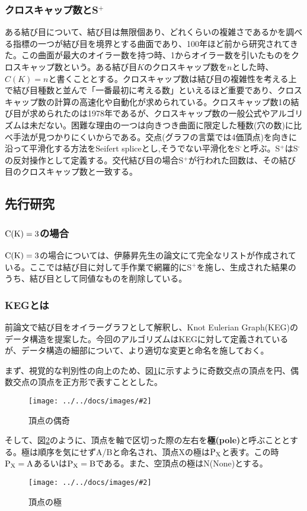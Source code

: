 \documentclass[11pt,a4j]{jarticle}
\newcommand{\splus}{S${}^\text{+}$}
\newcommand{\sminus}{S${}^\text{-}$}
\newcommand{\f}[1]{$\rm{#1}$} %
\newcommand{\image}[4][height=100pt]{%
\begin{figure}[htbp]
    \centering
    \texttt{[image: ../../docs/images/\#2]}
    \caption{#3}
    \label{fig:#4}
\end{figure}%
}
\newcommand{\tops}[2]{\texorpdfstring{#1}{#2}} %
\begin{document}
\subsubsection{クロスキャップ数と\tops{\splus}{splus}}
ある結び目について、結び目は無限個あり、どれくらいの複雑さであるかを調べる指標の一つが結び目を境界とする曲面であり、100年ほど前から研究されてきた。この曲面が最大のオイラー数を持つ時、1からオイラー数を引いたものをクロスキャップ数という。ある結び目$K$のクロスキャップ数を$n$とした時、$C(K)=n$と書くこととする。クロスキャップ数は結び目の複雑性を考える上で結び目種数と並んで「一番最初に考える数」といえるほど重要であり、クロスキャップ数の計算の高速化や自動化が求められている。クロスキャップ数1の結び目が求められたのは1978年\cite{MR478131}であるが、クロスキャップ数の一般公式やアルゴリズムは未だない。困難な理由の一つは向きつき曲面に限定した種数(穴の数)に比べ手法が見つかりにくいからである。交点(グラフの言葉では4価頂点)を向きに沿って平滑化する方法をSeifert spliceとし,そうでない平滑化を\sminus と呼ぶ。\splus は\sminus の反対操作として定義する。交代結び目の場合\splus が行われた回数は、その結び目のクロスキャップ数と一致する。


\subsection{先行研究}
\subsubsection{\tops{\f{C(K)=3}}{C(K)=3}の場合}
\f{C(K)=3}の場合については、伊藤昇先生の論文\cite{ck3}にて完全なリストが作成されている。ここでは結び目に対して手作業で網羅的に\splus を施し、生成された結果のうち、結び目として同値なものを削除している。

\subsubsection{KEGとは}
前論文\cite{keg}で結び目をオイラーグラフとして解釈し、Knot Eulerian Graph(KEG)のデータ構造を提案した。今回のアルゴリズムはKEGに対して定義されているが、データ構造の細部について、より適切な変更と命名を施しておく。

まず、視覚的な判別性の向上のため、図\ref{fig:parity}に示すように奇数交点の頂点を円、偶数交点の頂点を正方形で表すこととした。
\image{about_parity.jpg}{頂点の偶奇}{parity}

そして、図\ref{fig:pole}のように、頂点を軸で区切った際の左右を\textbf{極(pole)}と呼ぶこととする。極は順序を気にせずA/Bと命名され、頂点Xの極は\f{P_X}と表す。この時\f{P_X=A}あるいは\f{P_X=B}である。また、空頂点の極はN(None)とする。
\image[height=200pt]{about_pole.jpg}{頂点の極}{pole}
\end{document}

